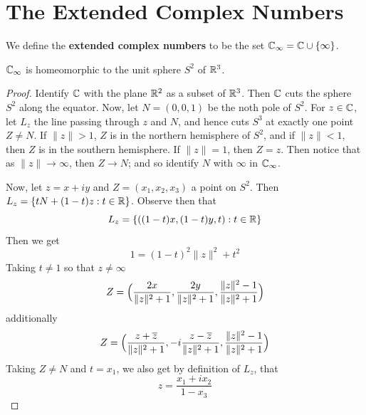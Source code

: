 \section{The Extended Complex Numbers}

\begin{definition}
    We define the \textbf{extended complex numbers} to be the set $\C_\infty=\C
    \cup \{\infty\}$.
\end{definition}

\begin{lemma}\label{1.3.1}
    $\C_\infty$ is homeomorphic to the unit sphere $S^2$ of $\R^3$.
\end{lemma}
\begin{proof}
    Identify $\C$ with the plane $\R^2$ as a subset of $\R^3$. Then  $\C$ cuts
    the sphere  $S^2$ along the equator. Now, let  $N=(0,0,1)$ be the noth pole
    of $S^2$. For  $z \in \C$, let  $L_z$ the line passing through $z$ and $N$,
    and hence cuts  $S^3$ at exactly one point  $Z \neq N$. If  $\|z\|>1$,  $Z$
    is in the northern hemisphere of  $S^2$, and if  $\|z\|<1$, then  $Z$ is in
    the southern hemisphere. If  $\|z\|=1$, then  $Z=z$. Then notice that as
    $\|z\| \xrightarrow{} \infty$, then $Z \xrightarrow{} N$; and so identify
    $N$ with  $\infty$ in  $\C_\infty$.

    Now, let  $z=x+iy$ and  $Z=(x_1,x_2,x_3)$ a point on $S^2$. Then
    $L_z=\{tN+(1-t)z : t \in \R\}$. Observe then that
    \begin{equation*}
        L_z=\{((1-t)x,(1-t)y,t) : t \in \R\}
    \end{equation*}
    Then we get
    \begin{equation*}
        1=(1-t)^2\|z\|^2+t^2
    \end{equation*}
    Taking $t \neq 1$ so that  $z \neq \infty$
    \begin{equation*}
        Z=\Big{(}\frac{2x}{\|z\|^2+1},\frac{2y}{\|z\|^2+1},
        \frac{\|z\|^2-1}{\|z\|^2+1}\Big{)}
    \end{equation*}
    additionally
    \begin{equation*}
        Z=\Big{(}\frac{z+\bar{z}}{\|z\|^2+1},-i\frac{z-\bar{z}}{\|z\|^2+1},
        \frac{\|z\|^2-1}{\|z\|^2+1}\Big{)}
    \end{equation*}
    Taking $Z \neq N$ and  $t=x_1$, we also get by definition of $L_z$, that
    \begin{equation*}
        z=\frac{x_1+ix_2}{1-x_3}
    \end{equation*}


\end{proof}
